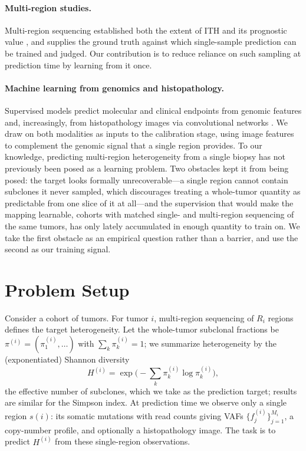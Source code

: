 \documentclass{article}
\begin{document}
\paragraph{Multi-region studies.} Multi-region sequencing established both the extent
of ITH and its prognostic value \citep{Gerlinger2012,Yates2015,deBruin2014}, and
supplies the ground truth against which single-sample prediction can be trained and
judged. Our contribution is to reduce reliance on such sampling at prediction time by
learning from it once.

\paragraph{Machine learning from genomics and histopathology.} Supervised models
predict molecular and clinical endpoints from genomic features and, increasingly,
from histopathology images via convolutional networks
\citep{He2016,Yu2016}. We draw on both modalities as inputs to the calibration
stage, using image features to complement the genomic signal that a single region
provides. To our knowledge, predicting multi-region heterogeneity from a single
biopsy has not previously been posed as a learning problem. Two obstacles kept it
from being posed: the target looks formally unrecoverable---a single region cannot
contain subclones it never sampled, which discourages treating a whole-tumor quantity
as predictable from one slice of it at all---and the supervision that would make the
mapping learnable, cohorts with matched single- and multi-region sequencing of the
same tumors, has only lately accumulated in enough quantity to train on. We take the
first obstacle as an empirical question rather than a barrier, and use the second as
our training signal.

\section{Problem Setup}

Consider a cohort of tumors. For tumor $i$, multi-region sequencing of $R_i$ regions
defines the target heterogeneity. Let the whole-tumor subclonal fractions be
$\pi^{(i)} = (\pi^{(i)}_1, \dots)$ with $\sum_k \pi^{(i)}_k = 1$; we summarize
heterogeneity by the (exponentiated) Shannon diversity
\begin{equation}
H^{(i)} = \exp\!\Big( -\sum_k \pi^{(i)}_k \log \pi^{(i)}_k \Big),
\label{eq:H}
\end{equation}
the effective number of subclones, which we take as the prediction target; results
are similar for the Simpson index. At prediction time we observe only a single region
$s(i)$: its somatic mutations with read counts giving VAFs
$\{f^{(i)}_j\}_{j=1}^{M_i}$, a copy-number profile, and optionally a histopathology
image. The task is to predict $H^{(i)}$ from these single-region observations.
\end{document}
